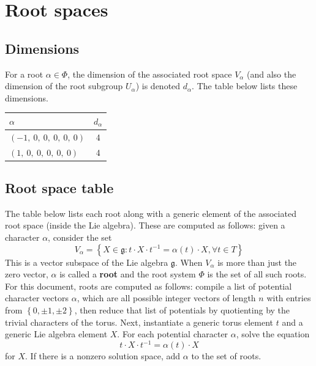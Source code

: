\documentclass[11pt]{article}
\newcommand{\noi}{\noindent}
\newcommand{\tbf}{\textbf}
\newcommand{\inv}{^{-1}}
\newcommand{\lb}{\left\{}
\newcommand{\rb}{\right\}}
\newcommand{\frakg}{\mathfrak{g}}
\theoremstyle{definition}
\begin{document}
\newpage
\section{Root spaces}

\subsection{Dimensions}

For a root $\alpha \in \Phi$, the dimension of the associated root space $V_\alpha$ (and also the dimension of the root subgroup $U_\alpha$) is denoted $d_\alpha$. The table below lists these dimensions.

\bigskip

\noindent \begin{tabular}{|l|c|}
    \hline
    \textbf{$\alpha$} & \textbf{$d_{\alpha}$} \\
    \hline
    $\left( -1, \  0, \  0, \  0, \  0, \  0\right)$ & 4 \\
    \hline
    $\left( 1, \  0, \  0, \  0, \  0, \  0\right)$ & 4 \\
    \hline
\end{tabular}


\subsection{Root space table}

\noi The table below lists each root along with a generic element of the associated root space (inside the Lie algebra). These are computed as follows: given a character $\alpha$, consider the set
\[
	V_\alpha = \lb X \in \frakg : t \cdot X \cdot t \inv = \alpha(t) \cdot X, \forall t \in T \rb
\]
This is a vector subspace of the Lie algebra $\frakg$. When $V_\alpha$ is more than just the zero vector, $\alpha$ is called a \tbf{root} and the root system $\Phi$ is the set of all such roots. For this document, roots are computed as follows: compile a list of potential character vectors $\alpha$, which are all possible integer vectors of length $n$ with entries from $\lb 0, \pm 1, \pm 2 \rb$, then reduce that list of potentials by quotienting by the trivial characters of the torus. Next, instantiate a generic torus element $t$ and a generic Lie algebra element $X$. For each potential character $\alpha$, solve the equation
\[
	t \cdot X \cdot t \inv = \alpha(t) \cdot X
\]
for $X$. If there is a nonzero solution space, add $\alpha$ to the set of roots.

\bigskip
\end{document}
